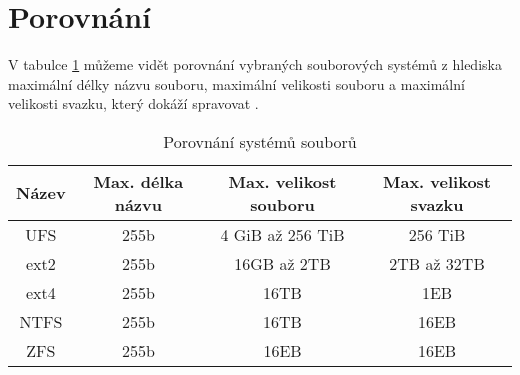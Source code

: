 \section{Porovnání}
    V tabulce \ref{fscompare} můžeme vidět porovnání vybraných souborových systémů z hlediska maximální délky názvu souboru, maximální velikosti souboru a maximální velikosti svazku, který dokáží spravovat \cite{data}.
    \begin{table}[]
    \centering
    \caption{Porovnání systémů souborů}
    \label{fscompare}
    \begin{tabular}{|c|c|c|c|}
    \hline
    Název & Max. délka názvu & Max. velikost souboru & Max. velikost svazku \\ \hline
    UFS & 255b & 4 GiB až 256 TiB & 256 TiB \\ \hline
    ext2 & 255b & 16GB až 2TB & 2TB až 32TB \\ \hline
    ext4 & 255b & 16TB & 1EB \\ \hline
    NTFS & 255b & 16TB & 16EB \\ \hline
    ZFS & 255b & 16EB & 16EB \\ \hline
    \end{tabular}
    \end{table} 
